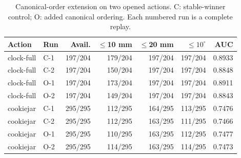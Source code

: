 \begin{table}[t]\centering\scriptsize
\caption{Canonical-order extension on two opened actions. C: stable-winner control; O: added canonical ordering. Each numbered run is a complete replay.}
\label{tab:bt-order-cross}
\begin{tabular}{llrrrrr}\toprule
Action & Run & Avail. & $\leq$10 mm & $\leq$20 mm & $\leq10^\circ$ & AUC\\\midrule
clock-full & C-1 & 197/204 & 179/204 & 197/204 & 197/204 & 0.8933\\
clock-full & C-2 & 197/204 & 150/204 & 197/204 & 197/204 & 0.8848\\
clock-full & O-1 & 197/204 & 173/204 & 197/204 & 197/204 & 0.8911\\
clock-full & O-2 & 197/204 & 149/204 & 197/204 & 197/204 & 0.8843\\
cookiejar & C-1 & 295/295 & 112/295 & 164/295 & 113/295 & 0.7476\\
cookiejar & C-2 & 295/295 & 112/295 & 163/295 & 111/295 & 0.7466\\
cookiejar & O-1 & 295/295 & 110/295 & 163/295 & 112/295 & 0.7477\\
cookiejar & O-2 & 295/295 & 114/295 & 163/295 & 114/295 & 0.7473\\
\bottomrule\end{tabular}\end{table}
